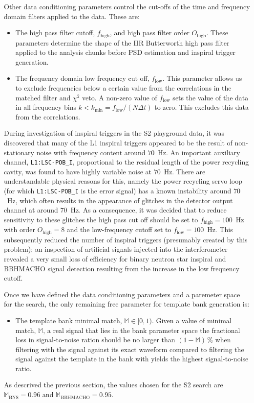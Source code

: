 Other data conditioning parameters control the cut-offs of the time
and frequency domain filters applied to the data. These are:
\begin{itemize}
\item The high pass filter cutoff, $f_\mathrm{high}$, and high pass filter
order $O_\mathrm{high}$. These parameters determine the shape of the IIR
Butterworth high pass filter applied to the analysis chunks before PSD
estimation and inspiral trigger generation.

\item The frequency domain low frequency cut off, $f_\mathrm{low}$. This
parameter allows us to exclude frequencies below a certain value from the
correlations in the matched filter and $\chi^2$ veto. A non-zero value of
$f_\mathrm{low}$ sets the value of the data in all frequency bins $k <
k_\mathrm{min} = f_\mathrm{low} / (N \Delta t)$ to zero. This excludes this
data from the correlations.
\end{itemize}
During investigation of inspiral triggers in the S2 playground data, it was
discovered that many of the L1 inspiral triggers appeared to be the result of
non-stationary noise with frequency content around $70$~Hz.  An important
auxiliary channel, \texttt{L1:LSC-POB\_I}, proportional to the residual length
of the power recycling cavity, was found to have highly variable noise at
$70$~Hz.  There are understandable physical reasons for this, namely the power
recycling servo loop (for which \texttt{L1:LSC-POB\_I} is the error signal)
has a known instability around $70$~Hz, which often results in the appearance
of glitches in the detector output channel at around $70$~Hz.  As a
consequence, it was decided that to reduce sensitivity to these glitches the
high pass cut off should be set to $f_\mathrm{high} = 100$~Hz with order
$O_\mathrm{high} = 8$ and the low-frequency cutoff set to $f_\mathrm{low} =
100$~Hz.  This subsequently reduced the number of inspiral triggers
(presumably created by this problem); an inspection of artificial signals
injected into the interferometer revealed a very small loss of efficiency for
binary neutron star inspiral and BBHMACHO signal detection resulting from the
increase in the low frequency cutoff.

Once we have defined the data conditioning parameters and a paremeter space
for the search, the only remaining free parameter for template bank generation
is:
\begin{itemize}
\item The template bank minimal match, $\mathbb{M} \in [0,1)$. Given a value
of minimal match, $\mathbb{M}$, a real signal that lies in the bank parameter
space the fractional loss in signal-to-noise ration should be no larger than
$(1 - \mathbb{M})\, \%$ when filtering with the signal against its exact
waveform compared to filtering the signal against the template in the bank
with yields the highest signal-to-noise ratio.
\end{itemize}
As descrived the previous section, the values chosen for the S2 search are
$\mathbb{M}_\mathrm{BNS} = 0.96$ and $\mathbb{M}_\mathrm{BBHMACHO} = 0.95$. 

